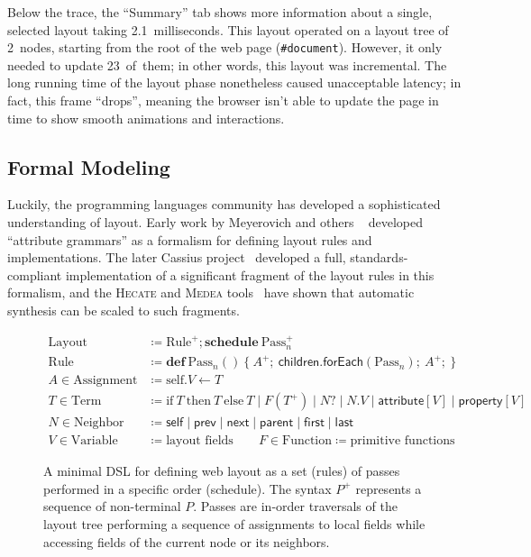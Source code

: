 Below the trace, the ``Summary'' tab shows
  more information about a single, selected layout
  taking 2.1~milliseconds.
This layout operated
  on a layout tree of 2~nodes,
  starting from the root of the web page (\texttt{\#document}).
However, it only needed to update 23~of~them;
  in other words, this layout was incremental.
The long running time of the layout phase
  nonetheless caused unacceptable latency;
  in fact, this frame ``drops'',
  meaning the browser isn't able to update the page
  in time to show smooth animations and interactions.

\subsection{Formal Modeling}

Luckily, the programming languages community
  has developed a sophisticated understanding of layout.
Early work by Meyerovich and others%
  ~\cite{meyerovich-1,meyerovich-2,meyerovich-3}
  developed ``attribute grammars'' as a formalism
  for defining layout rules and implementations.
The later Cassius project~\cite{cassius-1,cassius-2,cassius-3}
  developed a full, standards-compliant implementation
  of a significant fragment of the layout rules
  in this formalism,
  and the \textsc{Hecate} and \textsc{Medea}
  tools~\cite{yufeng-1,yufeng-2}
  have shown that automatic synthesis can be scaled
  to such fragments.  

\begin{figure}
\begin{align*}
\text{Layout} &\coloneq  \text{Rule}^+; \textbf{schedule}\:\text{Pass}_n^+ \\
\text{Rule} &\coloneq
  \mathbf{def}\:\text{Pass}_n()\:\{\:
    A^+;\:
    \mathsf{children}.\mathsf{forEach}(\text{Pass}_n);\:
    A^+;\:
  \} \\
A \in \text{Assignment} &\coloneq
  \text{self}.V \leftarrow T \\[4pt]
T \in \text{Term} &\coloneq
  \text{if}\ T\ \text{then}\ T\ \text{else}\ T \mid
  F(T^+) \mid
  N? \mid
  N.V \mid
  \mathsf{attribute}[V] \mid
  \mathsf{property}[V] \\
N \in \text{Neighbor} &\coloneq
  \mathsf{self} \mid \mathsf{prev} \mid
  \mathsf{next} \mid \mathsf{parent} \mid
  \mathsf{first} \mid \mathsf{last} \\[4pt]
V \in \text{Variable} &\coloneq \text{layout fields} \quad\quad
F \in \text{Function} \coloneq \text{primitive functions}
\end{align*}
\caption{
  A minimal DSL for defining web layout
    as a set (\textsf{rules}) of passes
    performed in a specific order (\textsf{schedule}).
  The syntax $P^+$ represents a sequence of non-terminal $P$.
  Passes are in-order traversals of the layout tree
    performing a sequence of assignments to local fields
    while accessing fields of the current node or its neighbors.
}
\label{fig:dsl}
\end{figure}

